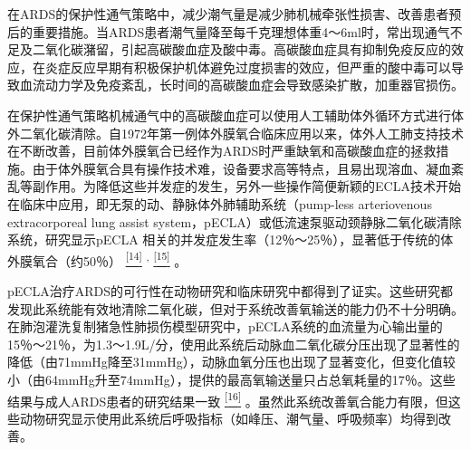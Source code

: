 在ARDS的保护性通气策略中，减少潮气量是减少肺机械牵张性损害、改善患者预后的重要措施。当ARDS患者潮气量降至每千克理想体重4～6ml时，常出现通气不足及二氧化碳潴留，引起高碳酸血症及酸中毒。高碳酸血症具有抑制免疫反应的效应，在炎症反应早期有积极保护机体避免过度损害的效应，但严重的酸中毒可以导致血流动力学及免疫紊乱，长时间的高碳酸血症会导致感染扩散，加重器官损伤。

在保护性通气策略机械通气中的高碳酸血症可以使用人工辅助体外循环方式进行体外二氧化碳清除。自1972年第一例体外膜氧合临床应用以来，体外人工肺支持技术在不断改善，目前体外膜氧合已经作为ARDS时严重缺氧和高碳酸血症的拯救措施。由于体外膜氧合具有操作技术难，设备要求高等特点，且易出现溶血、凝血紊乱等副作用。为降低这些并发症的发生，另外一些操作简便新颖的ECLA技术开始在临床中应用，即无泵的动、静脉体外肺辅助系统（pump-less
arteriovenous extracorporeal lung assist
system，pECLA）或低流速泵驱动颈静脉二氧化碳清除系统，研究显示pECLA
相关的并发症发生率（12％～25％），显著低于传统的体外膜氧合（约50％）
\protect\hyperlink{text00030.htmlux5cux23ch14-29}{\textsuperscript{{[}14{]}}}
\textsuperscript{,}
\protect\hyperlink{text00030.htmlux5cux23ch15-29}{\textsuperscript{{[}15{]}}}
。

pECLA治疗ARDS的可行性在动物研究和临床研究中都得到了证实。这些研究都发现此系统能有效地清除二氧化碳，但对于系统改善氧输送的能力仍不十分明确。在肺泡灌洗复制猪急性肺损伤模型研究中，pECLA系统的血流量为心输出量的15％～21％，为1.3～1.9L/分，使用此系统后动脉血二氧化碳分压出现了显著性的降低（由71mmHg降至31mmHg），动脉血氧分压也出现了显著变化，但变化值较小（由64mmHg升至74mmHg），提供的最高氧输送量只占总氧耗量的17％。这些结果与成人ARDS患者的研究结果一致
\protect\hyperlink{text00030.htmlux5cux23ch16-29}{\textsuperscript{{[}16{]}}}
。虽然此系统改善氧合能力有限，但这些动物研究显示使用此系统后呼吸指标（如峰压、潮气量、呼吸频率）均得到改善。

